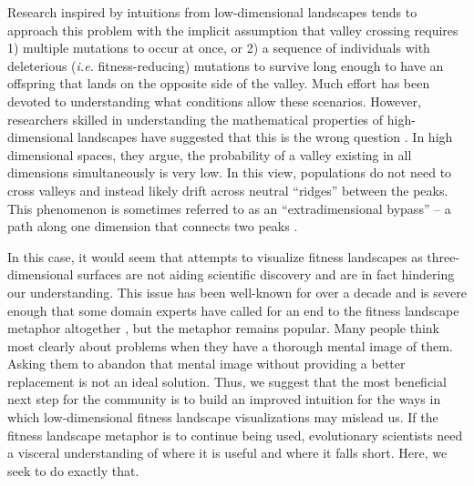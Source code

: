 Research inspired by intuitions from low-dimensional landscapes tends to approach this problem with the implicit assumption that valley crossing requires 1) multiple mutations to occur at once, or 2) a sequence of individuals with deleterious (\textit{i.e.} fitness-reducing) mutations to survive long enough to have an offspring that lands on the opposite side of the valley. Much effort has been devoted to understanding what conditions allow these scenarios. However, researchers skilled in understanding the mathematical properties of high-dimensional landscapes have suggested that this is the wrong question \citep{kaplan_end_2008, gavrilets_2010}. In high dimensional spaces, they argue, the probability of a valley existing in all dimensions simultaneously is very low. In this view, populations do not need to cross valleys and instead likely drift across neutral ``ridges'' between the peaks. This phenomenon is sometimes referred to as an ``extradimensional bypass'' -- a path along one dimension that connects two peaks \citep{cariani_extradimensional_2002}. %


In this case, it would seem that attempts to visualize fitness landscapes as three-dimensional surfaces are not aiding scientific discovery and are in fact hindering our understanding. This issue has been well-known for over a decade and is severe enough that some domain experts have called for an end to the fitness landscape metaphor altogether \citep{kaplan_end_2008}, but the metaphor remains popular. Many people think most clearly about problems when they have a thorough mental image of them. Asking them to abandon that mental image without providing a better replacement is not an ideal solution. Thus, we suggest that the most beneficial next step for the community is to build an improved intuition for the ways in which low-dimensional fitness landscape visualizations may mislead us. If the fitness landscape metaphor is to continue being used, evolutionary scientists need a visceral understanding of where it is useful and where it falls short. Here, we seek to do exactly that. 

